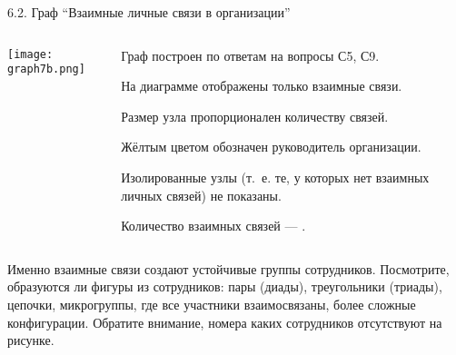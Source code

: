 \begin{frame}{6.2. Граф ``Взаимные личные связи в организации''}

\begin{columns}
\begin{column}{0.7\textwidth} 
\centering
          \texttt{[image: graph7b.png]}
\end{column}
\begin{column}{0.25\textwidth} 
\tiny
Граф построен по ответам на вопросы С5, С9.
\smallskip

На диаграмме отображены только взаимные связи.
\smallskip

Размер узла пропорционален количеству связей.
\smallskip

Жёлтым цветом обозначен руководитель организации.
\smallskip

Изолированные узлы (т.~е. те, у которых нет взаимных личных связей) не показаны.
\bigskip

Количество взаимных связей --- \valGBlinks.

\end{column}
\end{columns}

\fontsize{6pt}{7}\selectfont
Именно взаимные связи создают устойчивые группы сотрудников. Посмотрите, образуются ли фигуры из сотрудников: 
пары (диады), треугольники (триады), цепочки, микрогруппы, где все участники взаимосвязаны, более сложные конфигурации.
Обратите внимание, номера каких сотрудников отсутствуют на рисунке. 


\end{frame}


